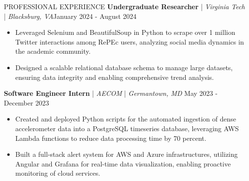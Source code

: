 \begin{rSection}{PROFESSIONAL EXPERIENCE}
    \textbf{Undergraduate Researcher} | \textit{Virginia Tech} | \textit{Blacksburg, VA}\hfill January 2024 - August 2024\\
    \begin{itemize}[leftmargin=12pt]
        \itemsep -4pt {} \vspace{-1.4em}
        \item Leveraged Selenium and BeautifulSoup in Python to scrape over 1 million Twitter interactions among RePEc users, analyzing social media dynamics in the academic community.
        \item Designed a scalable relational database schema to manage large datasets, ensuring data integrity and enabling comprehensive trend analysis.
    \end{itemize}
    
    \textbf{Software Engineer Intern} | \textit{AECOM} | \textit{Germantown, MD} \hfill May 2023 - December 2023\\
    \begin{itemize}[leftmargin=12pt]
        \itemsep -4pt {} \vspace{-1.4em}
        \item Created and deployed Python scripts for the automated ingestion of dense accelerometer data into a PostgreSQL timeseries database, leveraging AWS Lambda functions to reduce data processing time by 70 percent.
        \item Built a full-stack alert system for AWS and Azure infrastructures, utilizing Angular and Grafana for real-time data visualization, enabling proactive monitoring of cloud services.
    \end{itemize}

\end{rSection}
